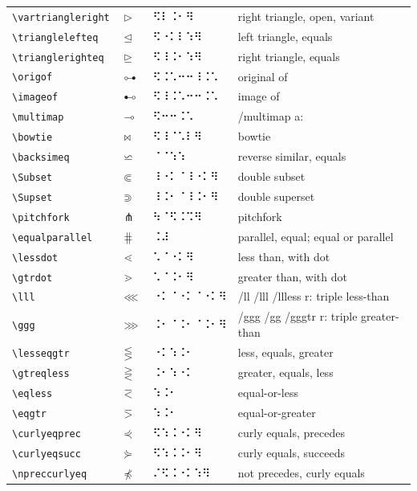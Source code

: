 \documentclass[oneside]{article}
\begin{document}
\begin{longtable}{llll}
\verb|\vartriangleright| & $\vartriangleright$ &   ⠫⠇⠨⠂⠻   & {right triangle, open, variant} \\[2ex]
\verb|\trianglelefteq| & $\trianglelefteq$ &   ⠫⠐⠅⠇⠱⠻   & {left triangle, equals} \\[2ex]
\verb|\trianglerighteq| & $\trianglerighteq$ &   ⠫⠸⠨⠂⠱⠻   & {right triangle, equals} \\[2ex]
\verb|\origof| & $\origof$ &   ⠫⠨⠡⠒⠒⠸⠨⠡   & {original of} \\[2ex]
\verb|\imageof| & $\imageof$ &   ⠫⠸⠨⠡⠒⠒⠨⠡   & {image of} \\[2ex]
\verb|\multimap| & $\multimap$ &   ⠫⠒⠒⠨⠡   & {/multimap a:} \\[2ex]
\verb|\bowtie| & $\bowtie$ &   ⠫⠸⠈⠡⠇⠻   & {bowtie} \\[2ex]
\verb|\backsimeq| & $\backsimeq$ &   ⠈⠈⠱⠱   & {reverse similar, equals} \\[2ex]
\verb|\Subset| & $\Subset$ &   ⠸⠐⠅⠈⠸⠐⠅⠻   & {double subset} \\[2ex]
\verb|\Supset| & $\Supset$ &   ⠸⠨⠂⠈⠸⠨⠂⠻   & {double superset} \\[2ex]
\verb|\pitchfork| & $\pitchfork$ &   ⠳⠈⠫⠨⠩⠻   & {pitchfork} \\[2ex]
\verb|\equalparallel| & $\equalparallel$ &   ⠨⠼   & {parallel, equal; equal or parallel} \\[2ex]
\verb|\lessdot| & $\lessdot$ &   ⠡⠈⠐⠅⠻   & {less than, with dot} \\[2ex]
\verb|\gtrdot| & $\gtrdot$ &   ⠡⠈⠨⠂⠻   & {greater than, with dot} \\[2ex]
\verb|\lll| & $\lll$ &   ⠐⠅⠈⠐⠅⠈⠐⠅⠻   & {/ll /lll /llless r: triple less-than} \\[2ex]
\verb|\ggg| & $\ggg$ &   ⠨⠂⠈⠨⠂⠈⠨⠂⠻   & {/ggg /gg /gggtr r: triple greater-than} \\[2ex]
\verb|\lesseqgtr| & $\lesseqgtr$ &   ⠐⠅⠱⠨⠂   & {less, equals, greater} \\[2ex]
\verb|\gtreqless| & $\gtreqless$ &   ⠨⠂⠱⠐⠅   & {greater, equals, less} \\[2ex]
\verb|\eqless| & $\eqless$ &   ⠱⠨⠂   & {equal-or-less} \\[2ex]
\verb|\eqgtr| & $\eqgtr$ &   ⠱⠨⠂   & {equal-or-greater} \\[2ex]
\verb|\curlyeqprec| & $\curlyeqprec$ &   ⠫⠱⠨⠐⠅⠻   & {curly equals, precedes} \\[2ex]
\verb|\curlyeqsucc| & $\curlyeqsucc$ &   ⠫⠱⠨⠨⠂⠻   & {curly equals, succeeds} \\[2ex]
\verb|\npreccurlyeq| & $\npreccurlyeq$ &   ⠌⠫⠨⠐⠅⠱⠻   & {not precedes, curly equals} \\[2ex]

\end{longtable}
\end{document}
